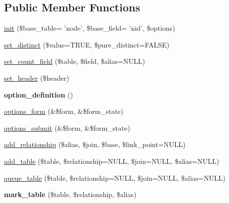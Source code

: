 \subsection*{Public Member Functions}
\begin{DoxyCompactItemize}
\item 
\hyperlink{classviews__plugin__query__default_af724e9bdf8dc76ae3956c3ffa5b43d71}{init} (\$base\_\-table= 'node', \$base\_\-field= 'nid', \$options)
\item 
\hyperlink{classviews__plugin__query__default_a637c0338f3140dbc78ae02620e05d8ed}{set\_\-distinct} (\$value=TRUE, \$pure\_\-distinct=FALSE)
\item 
\hyperlink{classviews__plugin__query__default_a6172cc82ea98666a7f242fd469df5123}{set\_\-count\_\-field} (\$table, \$field, \$alias=NULL)
\item 
\hyperlink{classviews__plugin__query__default_a604b0a86224c6e71447338234795dafc}{set\_\-header} (\$header)
\item 
\hypertarget{classviews__plugin__query__default_a08b1eac3a1a5272132a45d32a0e50ea1}{
{\bfseries option\_\-definition} ()}
\label{classviews__plugin__query__default_a08b1eac3a1a5272132a45d32a0e50ea1}

\item 
\hyperlink{classviews__plugin__query__default_ab34cb54bf886643b1d16dc73f8ff78dc}{options\_\-form} (\&\$form, \&\$form\_\-state)
\item 
\hyperlink{classviews__plugin__query__default_aac79abee5640db26687e1794097e0798}{options\_\-submit} (\&\$form, \&\$form\_\-state)
\item 
\hyperlink{classviews__plugin__query__default_a01f5ea8c8b5e5e472f8303e5af185d8e}{add\_\-relationship} (\$alias, \$join, \$base, \$link\_\-point=NULL)
\item 
\hyperlink{classviews__plugin__query__default_a5a5bdfd26f77b8063efb0f6df5d9a232}{add\_\-table} (\$table, \$relationship=NULL, \$join=NULL, \$alias=NULL)
\item 
\hyperlink{classviews__plugin__query__default_af3f53b356b6b979a0d511b14274a5bdb}{queue\_\-table} (\$table, \$relationship=NULL, \$join=NULL, \$alias=NULL)
\item 
\hypertarget{classviews__plugin__query__default_a025f301529991de1085b7e4e288b3cfe}{
{\bfseries mark\_\-table} (\$table, \$relationship, \$alias)}
\label{classviews__plugin__query__default_a025f301529991de1085b7e4e288b3cfe}


\end{DoxyCompactItemize}

